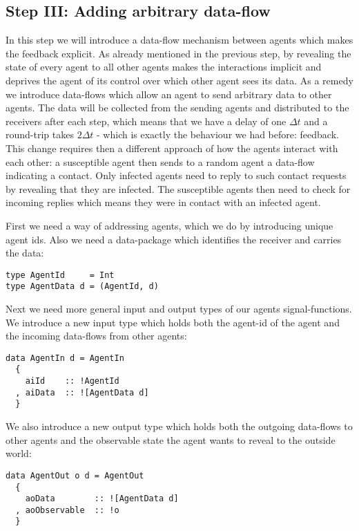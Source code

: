 \subsection{Step III: Adding arbitrary data-flow}
In this step we will introduce a data-flow mechanism between agents which makes the feedback explicit. As already mentioned in the previous step, by revealing the state of every agent to all other agents makes the interactions implicit and deprives the agent of its control over which other agent sees its data. 
As a remedy we introduce data-flows which allow an agent to send arbitrary data to other agents. The data will be collected from the sending agents and distributed to the receivers after each step, which means that we have a delay of one $\Delta t$ and a round-trip takes $2 \Delta t$ - which is exactly the behaviour we had before: feedback.
This change requires then a different approach of how the agents interact with each other: a susceptible agent then sends to a random agent a data-flow indicating a contact. Only infected agents need to reply to such contact requests by revealing that they are infected. The susceptible agents then need to check for incoming replies which means they were in contact with an infected agent.

First we need a way of addressing agents, which we do by introducing unique agent ids. Also we need a data-package which identifies the receiver and carries the data:
\begin{verbatim}
type AgentId     = Int
type AgentData d = (AgentId, d)
\end{verbatim}

Next we need more general input and output types of our agents signal-functions. We introduce a new input type which holds both the agent-id of the agent and the incoming data-flows from other agents:

\begin{verbatim}
data AgentIn d = AgentIn
  {
    aiId    :: !AgentId
  , aiData  :: ![AgentData d]
  } 
\end{verbatim}

We also introduce a new output type which holds both the outgoing data-flows to other agents and the observable state the agent wants to reveal to the outside world:

\begin{verbatim}
data AgentOut o d = AgentOut
  {
    aoData        :: ![AgentData d]
  , aoObservable  :: !o
  }
\end{verbatim}

